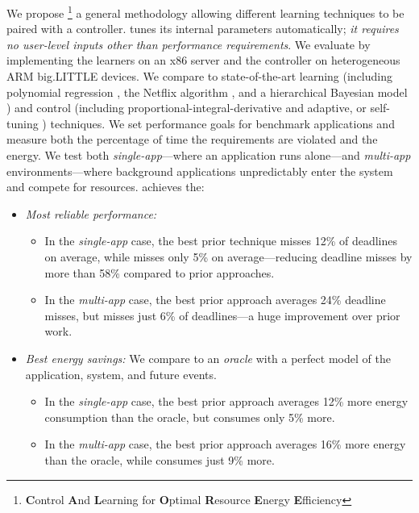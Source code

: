 We propose \SYSTEM{}\footnote{\textbf{C}ontrol \textbf{A}nd
  \textbf{L}earning for \textbf{O}ptimal \textbf{R}esource
  \textbf{E}nergy \textbf{E}fficiency} a general methodology allowing
different learning techniques to be paired with a controller.
\SYSTEM{} tunes its internal parameters automatically; \ie{} \emph{it
  requires no user-level inputs other than performance requirements}.
We evaluate \SYSTEM{} by implementing the learners on an x86 server
and the controller on heterogeneous ARM big.LITTLE devices.  We
compare to state-of-the-art learning (including polynomial regression
\cite{Koala,dubach2010}, the Netflix algorithm \cite{netflix,Paragon},
and a hierarchical Bayesian model \cite{LEO}) and control (including
proportional-integral-derivative \cite{Hellerstein2004a} and adaptive,
or self-tuning \cite{HandbookControl}) techniques.  We set performance
goals for benchmark applications and measure both the percentage of
time the requirements are violated and the energy.  We test both
\emph{single-app}---where an application runs alone---and
\emph{multi-app} environments---where background applications
unpredictably enter the system and compete for resources.  \SYSTEM{}
achieves the:
\begin{itemize}[leftmargin=1em]
\item \textit{Most reliable performance:}
  \begin{itemize}[leftmargin=1em]
  \item In the \emph{single-app} case, the best prior technique misses
    12\% of deadlines on average, while \SYSTEM{} misses only 5\% on
    average---reducing deadline misses by more than 58\% compared to
    prior approaches.
  \item In the \emph{multi-app} case, the best prior approach averages
    24\% deadline misses, but \SYSTEM{} misses just 6\% of
    deadlines---a huge improvement over prior work.
  \end{itemize}
\item \textit{Best energy savings:} We compare to an \emph{oracle}
  with a perfect model of the application, system, and future events.
  \begin{itemize}[leftmargin=1em]
  \item In the \emph{single-app} case, the best prior approach
    averages 12\% more energy consumption than the oracle, but
    \SYSTEM{} consumes only 5\% more.
  \item In the \emph{multi-app} case, the best prior approach averages
    16\% more energy than the oracle, while \SYSTEM{} consumes just
    9\% more.
  \end{itemize}
\end{itemize}

